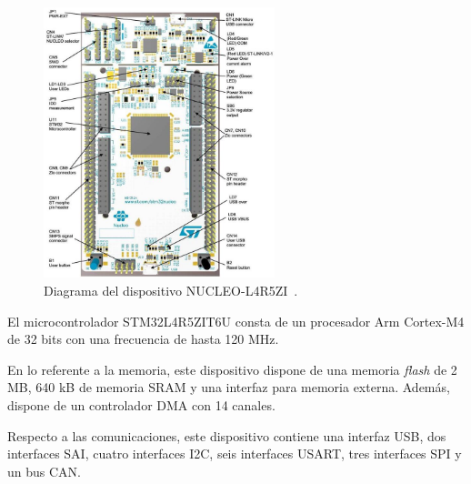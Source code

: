 \begin{figure}[h]
    \centering
    \includegraphics[width=0.6\textwidth]{figures/nucleo-l4r5zi.jpg}
    \caption{Diagrama del dispositivo NUCLEO-L4R5ZI~\cite{nucleo-img}.}
    \label{fig:nucleo-l4r5zi}
\end{figure}

El microcontrolador STM32L4R5ZIT6U consta de un procesador Arm Cortex-M4 de 32 bits con una frecuencia de hasta 120 MHz.

En lo referente a la memoria, este dispositivo dispone de una memoria \textit{flash} de 2 MB, 640 kB de memoria SRAM y una interfaz para memoria externa.
Además, dispone de un controlador \ac{DMA} con 14 canales.

Respecto a las comunicaciones, este dispositivo contiene una interfaz \ac{USB}, dos interfaces \ac{SAI}, cuatro interfaces \ac{I2C}, seis interfaces \ac{USART}, tres interfaces \ac{SPI} y un bus \ac{CAN}.



